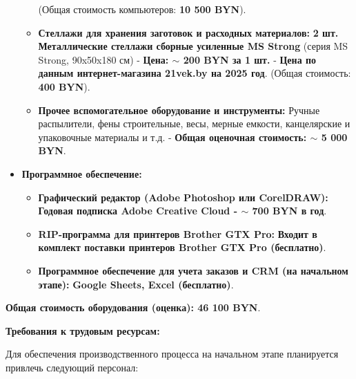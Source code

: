 \begin{itemize}
\begin{itemize}
\begin{itemize}
                \end{itemize} (Общая стоимость компьютеров: \textbf{10 500 BYN}).
            \item \textbf{Стеллажи для хранения заготовок и расходных материалов:} \textbf{2 шт. Металлические стеллажи сборные усиленные MS Strong} (серия MS Strong, 90x50x180 см) - \textbf{Цена: $\sim$ 200 BYN за 1 шт.} - \textbf{Цена по данным интернет-магазина 21vek.by на 2025 год}. (Общая стоимость: \textbf{400 BYN}).
            \item \textbf{Прочее вспомогательное оборудование и инструменты:}  Ручные распылители, фены строительные, весы, мерные емкости, канцелярские и упаковочные материалы и т.д. - \textbf{Общая оценочная стоимость: $\sim$ 5 000 BYN}.
        \end{itemize}
    \item \textbf{Программное обеспечение:}
        \begin{itemize}
            \item \textbf{Графический редактор (Adobe Photoshop или CorelDRAW):} \textbf{Годовая подписка Adobe Creative Cloud - $\sim$ 700 BYN в год}.
            \item \textbf{RIP-программа для принтеров Brother GTX Pro:} \textbf{Входит в комплект поставки принтеров Brother GTX Pro (бесплатно)}.
            \item \textbf{Программное обеспечение для учета заказов и CRM (на начальном этапе):} \textbf{Google Sheets, Excel (бесплатно)}.
        \end{itemize}
\end{itemize}

\textbf{Общая стоимость оборудования (оценка): 46 100 BYN}.

\vspace{0.3cm}

\textbf{Требования к трудовым ресурсам:}

Для обеспечения производственного процесса на начальном этапе планируется привлечь следующий персонал:

